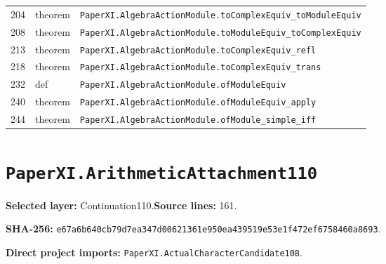 \documentclass[10pt,oneside]{book}
\begin{document}
\begin{longtable}{@{}p{}p{}p{}@{}}
204&theorem&\nolinkurl{PaperXI.AlgebraActionModule.toComplexEquiv_toModuleEquiv}\\

208&theorem&\nolinkurl{PaperXI.AlgebraActionModule.toModuleEquiv_toComplexEquiv}\\

213&theorem&\nolinkurl{PaperXI.AlgebraActionModule.toComplexEquiv_refl}\\

218&theorem&\nolinkurl{PaperXI.AlgebraActionModule.toComplexEquiv_trans}\\

232&def&\nolinkurl{PaperXI.AlgebraActionModule.ofModuleEquiv}\\

240&theorem&\nolinkurl{PaperXI.AlgebraActionModule.ofModuleEquiv_apply}\\

244&theorem&\nolinkurl{PaperXI.AlgebraActionModule.ofModule_simple_iff}\\

\bottomrule\end{longtable}

\section{\texorpdfstring{\nolinkurl{PaperXI.ArithmeticAttachment110}}{PaperXI.ArithmeticAttachment110}}\label{module:PaperXI.ArithmeticAttachment110}

\textbf{Selected layer:} Continuation110.\quad\textbf{Source lines:} 161.\par\textbf{SHA-256:} {\scriptsize\nolinkurl{e67a6b640cb79d7ea347d00621361e950ea439519e53e1f472ef6758460a8693}}.


\textbf{Direct project imports:} \nolinkurl{PaperXI.ActualCharacterCandidate108}.
\end{document}
